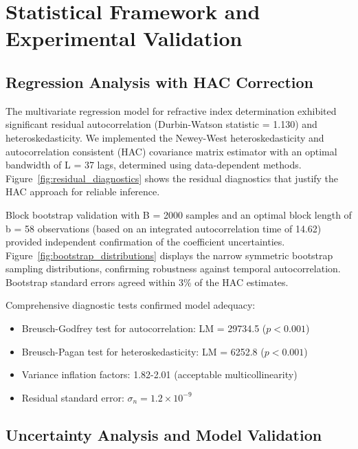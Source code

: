 \documentclass[aps,pra,reprint,groupedaddress,twocolumn,superscriptaddress]{revtex4-2}
\begin{document}
\section{Statistical Framework and Experimental Validation}
\label{app:statistics}

\subsection{Regression Analysis with HAC Correction}

The multivariate regression model for refractive index determination exhibited significant residual autocorrelation (Durbin-Watson statistic = 1.130) and heteroskedasticity. We implemented the Newey-West heteroskedasticity and autocorrelation consistent (HAC) covariance matrix estimator with an optimal bandwidth of L = 37 lags, determined using data-dependent methods. Figure~\ref{fig:residual_diagnostics} shows the residual diagnostics that justify the HAC approach for reliable inference.

Block bootstrap validation with B = 2000 samples and an optimal block length of b = 58 observations (based on an integrated autocorrelation time of 14.62) provided independent confirmation of the coefficient uncertainties. Figure~\ref{fig:bootstrap_distributions} displays the narrow symmetric bootstrap sampling distributions, confirming robustness against temporal autocorrelation. Bootstrap standard errors agreed within 3\% of the HAC estimates.
%

Comprehensive diagnostic tests confirmed model adequacy:
\begin{itemize}
\item Breusch-Godfrey test for autocorrelation: LM = 29734.5 ($p < 0.001$)
\item Breusch-Pagan test for heteroskedasticity: LM = 6252.8 ($p < 0.001$)  
\item Variance inflation factors: 1.82-2.01 (acceptable multicollinearity)
\item Residual standard error: $\sigma_n = 1.2 \times 10^{-9}$
\end{itemize}

\subsection{Uncertainty Analysis and Model Validation}
\end{document}
